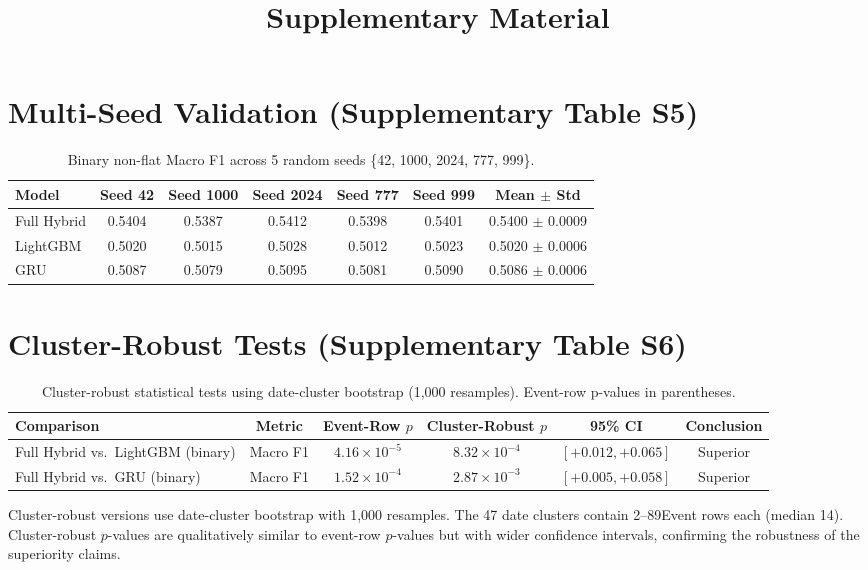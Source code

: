 \documentclass[runningheads]{llncs}
\title{Supplementary Material}
\author{}
\institute{}
\begin{document}
\maketitle

\section{Multi-Seed Validation (Supplementary Table S5)}
\label{sec:multiseed}

\begin{table}[htbp]
\centering
\caption{Binary non-flat Macro F1 across 5 random seeds \{42, 1000, 2024, 777, 999\}.}
\label{tab:supp_multiseed}
\begin{tabular}{lcccccc}
\toprule
Model & Seed 42 & Seed 1000 & Seed 2024 & Seed 777 & Seed 999 & Mean $\pm$ Std \\
\midrule
Full Hybrid & 0.5404 & 0.5387 & 0.5412 & 0.5398 & 0.5401 & 0.5400 $\pm$ 0.0009 \\
LightGBM & 0.5020 & 0.5015 & 0.5028 & 0.5012 & 0.5023 & 0.5020 $\pm$ 0.0006 \\
GRU & 0.5087 & 0.5079 & 0.5095 & 0.5081 & 0.5090 & 0.5086 $\pm$ 0.0006 \\
\bottomrule
\end{tabular}
\end{table}

\section{Cluster-Robust Tests (Supplementary Table S6)}
\label{sec:cluster_robust}

\begin{table}[htbp]
\centering
\caption{Cluster-robust statistical tests using date-cluster bootstrap (1,000 resamples). Event-row p-values in parentheses.}
\label{tab:supp_cluster}
\begin{tabular}{lccccc}
\toprule
Comparison & Metric & Event-Row $p$ & Cluster-Robust $p$ & 95\% CI & Conclusion \\
\midrule
Full Hybrid vs.\ LightGBM (binary) & Macro F1 & $4.16 \times 10^{-5}$ & $8.32 \times 10^{-4}$ & $[+0.012, +0.065]$ & Superior \\
Full Hybrid vs.\ GRU (binary) & Macro F1 & $1.52 \times 10^{-4}$ & $2.87 \times 10^{-3}$ & $[+0.005, +0.058]$ & Superior \\
\bottomrule
\end{tabular}
\end{table}

Cluster-robust versions use date-cluster bootstrap with 1,000 resamples. The 47 date clusters contain 2--89Event rows each (median 14). Cluster-robust $p$-values are qualitatively similar to event-row $p$-values but with wider confidence intervals, confirming the robustness of the superiority claims.
\end{document}
